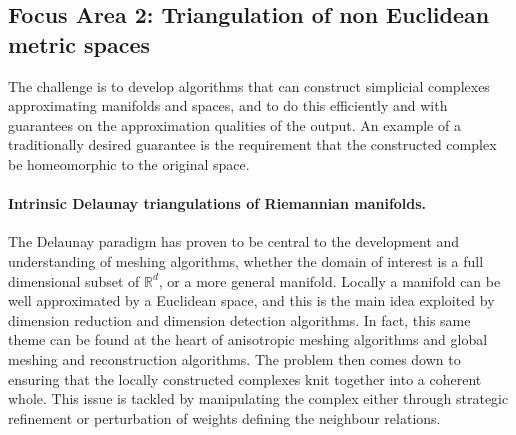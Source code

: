 %

\newcommand{\man}{\mathcal{M}}
\newcommand{\reel}{\mathbb{R}}
\newcommand{\rdee}{\reel^d}
\renewcommand{\pts}{P}
\newcommand{\mesh}{\hat{M}}

\newcommand{\ramsay}[1]{\framebox{#1}}%

\subsection*{Focus Area 2: Triangulation of non Euclidean metric spaces}

The challenge is to develop algorithms that can construct simplicial
complexes approximating manifolds and spaces, and to do
this efficiently and with guarantees on the approximation qualities of
the output.
%
An example of a traditionally desired guarantee is the requirement
that the constructed complex be homeomorphic to the original space.

\paragraph{Intrinsic Delaunay triangulations of Riemannian manifolds.}

The Delaunay paradigm has proven to be central to the development and
understanding of meshing algorithms, whether the domain of interest is
a full dimensional subset of $\rdee$, or a more general manifold. 
%
Locally a manifold can be well approximated by a Euclidean space, and
this is the main idea exploited by dimension reduction and dimension
detection algorithms. In fact, this same theme can be found at the
heart of anisotropic meshing algorithms and global meshing and
reconstruction algorithms. The problem then comes down to ensuring
that the locally constructed complexes knit together into a coherent
whole. This issue is tackled by manipulating the complex either
through strategic refinement or perturbation of weights defining the
neighbour relations. 

